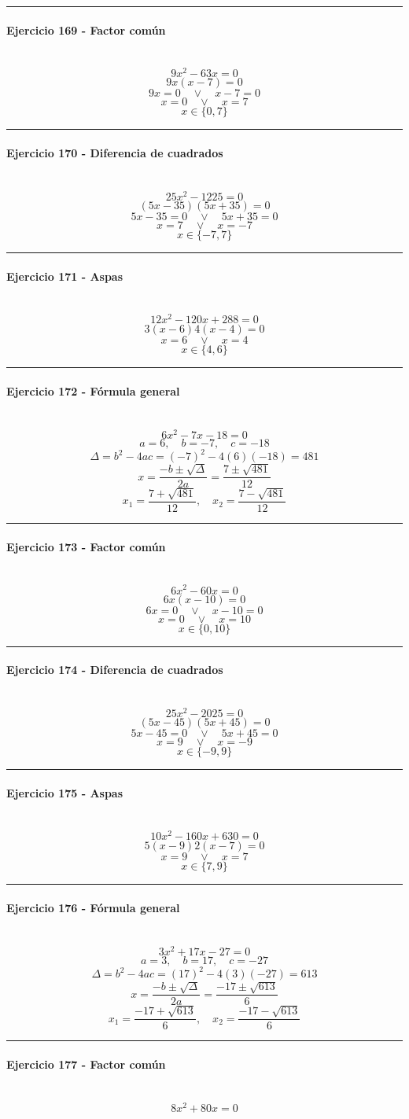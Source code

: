 \documentclass[10pt,a4paper]{article}
\newcommand{\res}[1]{\paragraph{#1}\mbox{}\\[-1.2em]}
\begin{document}
\vspace{1mm}\hrule\vspace{2mm}
\res{Ejercicio 169 - Factor común}
\[ 9 x^{2} - 63 x=0 \]
\[ 9x(x-7)=0 \]
\[ 9x=0 \quad \vee \quad x-7=0 \]
\[ x=0 \quad \vee \quad x=7 \]
\[ \boxed{x\in\{0,7\}} \]
\vspace{1mm}\hrule\vspace{2mm}
\res{Ejercicio 170 - Diferencia de cuadrados}
\[ 25 x^{2} - 1225=0 \]
\[ (5x-35)(5x+35)=0 \]
\[ 5x-35=0 \quad \vee \quad 5x+35=0 \]
\[ x=7 \quad \vee \quad x=-7 \]
\[ \boxed{x\in\{-7,7\}} \]
\vspace{1mm}\hrule\vspace{2mm}
\res{Ejercicio 171 - Aspas}
\[ 12 x^{2} - 120 x + 288=0 \]
\[ 3(x-6)4(x-4)=0 \]
\[ x=6 \quad \vee \quad x=4 \]
\[ \boxed{x\in\{4,6\}} \]
\vspace{1mm}\hrule\vspace{2mm}
\res{Ejercicio 172 - Fórmula general}
\[ 6 x^{2} - 7 x - 18=0 \]
\[ a=6,\quad b=-7,\quad c=-18 \]
\[ \Delta=b^2-4ac=(-7)^2-4(6)(-18)=481 \]
\[ x=\frac{-b\pm\sqrt{\Delta}}{2a}=\frac{7\pm\sqrt{481}}{12} \]
\[ \boxed{x_1=\frac{7+\sqrt{481}}{12},\quad x_2=\frac{7-\sqrt{481}}{12}} \]
\vspace{1mm}\hrule\vspace{2mm}
\res{Ejercicio 173 - Factor común}
\[ 6 x^{2} - 60 x=0 \]
\[ 6x(x-10)=0 \]
\[ 6x=0 \quad \vee \quad x-10=0 \]
\[ x=0 \quad \vee \quad x=10 \]
\[ \boxed{x\in\{0,10\}} \]
\vspace{1mm}\hrule\vspace{2mm}
\res{Ejercicio 174 - Diferencia de cuadrados}
\[ 25 x^{2} - 2025=0 \]
\[ (5x-45)(5x+45)=0 \]
\[ 5x-45=0 \quad \vee \quad 5x+45=0 \]
\[ x=9 \quad \vee \quad x=-9 \]
\[ \boxed{x\in\{-9,9\}} \]
\vspace{1mm}\hrule\vspace{2mm}
\res{Ejercicio 175 - Aspas}
\[ 10 x^{2} - 160 x + 630=0 \]
\[ 5(x-9)2(x-7)=0 \]
\[ x=9 \quad \vee \quad x=7 \]
\[ \boxed{x\in\{7,9\}} \]
\vspace{1mm}\hrule\vspace{2mm}
\res{Ejercicio 176 - Fórmula general}
\[ 3 x^{2} + 17 x - 27=0 \]
\[ a=3,\quad b=17,\quad c=-27 \]
\[ \Delta=b^2-4ac=(17)^2-4(3)(-27)=613 \]
\[ x=\frac{-b\pm\sqrt{\Delta}}{2a}=\frac{-17\pm\sqrt{613}}{6} \]
\[ \boxed{x_1=\frac{-17+\sqrt{613}}{6},\quad x_2=\frac{-17-\sqrt{613}}{6}} \]
\vspace{1mm}\hrule\vspace{2mm}
\res{Ejercicio 177 - Factor común}
\[ 8 x^{2} + 80 x=0 \]
\end{document}

